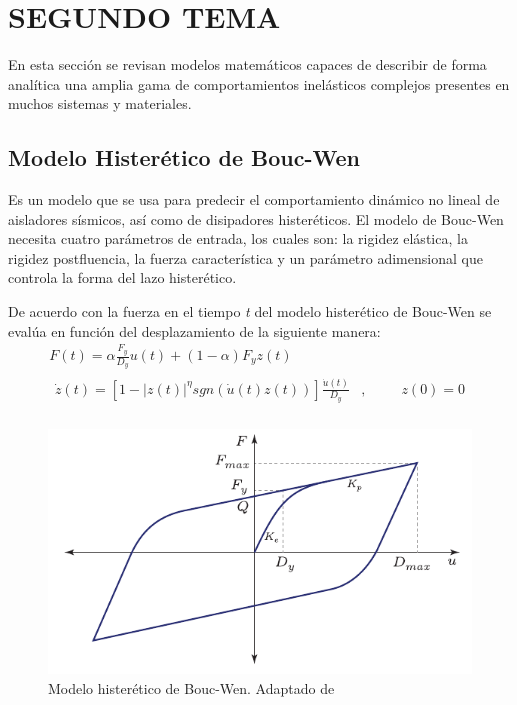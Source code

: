 \section{SEGUNDO TEMA}

En esta sección se revisan modelos matemáticos capaces de describir de forma analítica una amplia gama de comportamientos inelásticos complejos presentes en muchos sistemas y materiales.

	\subsection{Modelo Histerético de Bouc-Wen} \label{subsection:MHBW}
	
Es un modelo que se usa para predecir el comportamiento dinámico no lineal de aisladores sísmicos, así como de disipadores histeréticos. El modelo de Bouc-Wen necesita cuatro parámetros de entrada, los cuales son: la rigidez elástica, la rigidez postfluencia, la fuerza característica y un parámetro adimensional que controla la forma del lazo histerético.

De acuerdo con \citet{Charalampakis2010} la fuerza en el tiempo \textit{t} del modelo histerético de Bouc-Wen se evalúa en función del desplazamiento de la siguiente manera:
\begin{gather}
F(t)=\alpha \frac{F_{y}}{D_{y}}u(t)+(1-\alpha)F_{y}z(t)				\label{BoucWen1} \\
\begin{aligned}
\dot{z}(t)=\left[1-\left|z(t)\right |^{\eta}sgn(\dot{u}(t)z(t))\right]\frac{\dot{u}(t)}{D_{y}}&,&\hspace{1em}& z(0)=0 \\
\end{aligned}		\label{BoucWen2}
\end{gather}

	\begin{figure}[!h]
	\centering
		\includegraphics[scale=1]{E_IMAGENES/2_Capitulo2/Cap2_Imagen6.pdf}
	\caption[Modelo histerético de Bouc-Wen]{\centering\footnotesize Modelo histerético de Bouc-Wen. Adaptado de \citet{Charalampakis2010}}
	\label{Cap2_Figura6}
	\end{figure}

